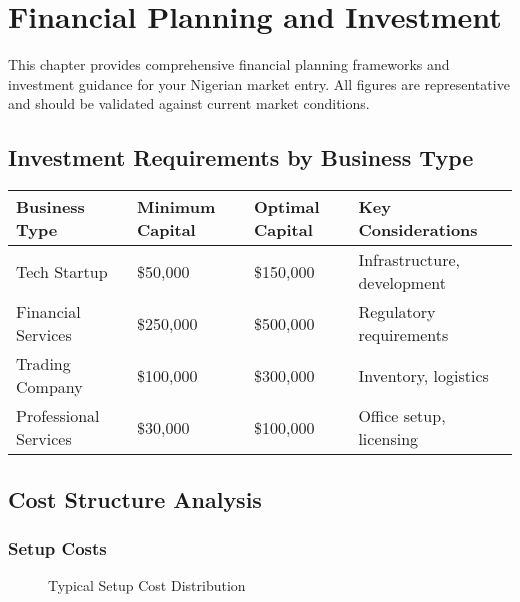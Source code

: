 
\chapter{Financial Planning and Investment}

\begin{importantbox}
This chapter provides comprehensive financial planning frameworks and investment guidance for your Nigerian market entry. All figures are representative and should be validated against current market conditions.
\end{importantbox}

\section{Investment Requirements by Business Type}

\begin{center}
\begin{tabular}{p{}|p{}|p{}|p{}}
    \textbf{Business Type} & \textbf{Minimum Capital} & \textbf{Optimal Capital} & \textbf{Key Considerations} \\
    \hline
    Tech Startup & \$50,000 & \$150,000 & Infrastructure, development \\
    Financial Services & \$250,000 & \$500,000 & Regulatory requirements \\
    Trading Company & \$100,000 & \$300,000 & Inventory, logistics \\
    Professional Services & \$30,000 & \$100,000 & Office setup, licensing \\
\end{tabular}
\end{center}

\section{Cost Structure Analysis}

\subsection{Setup Costs}
\begin{figure}[h]
    \centering
    \caption{Typical Setup Cost Distribution}
\end{figure}

